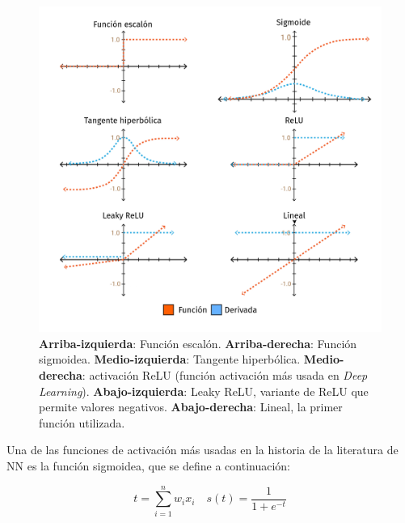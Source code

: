 \documentclass[a4paper,12pt]{article}
\begin{document}
\begin{figure}[H]
	\begin{center}				
		\includegraphics[width=1\textwidth]{021.png}
		\caption{\textbf{Arriba-izquierda}: Función escalón. \textbf{Arriba-derecha}: Función sigmoidea. \textbf{Medio-izquierda}: Tangente hiperbólica. \textbf{Medio-derecha}: activación ReLU (función activación más usada en \textit{Deep Learning}).
			\textbf{Abajo-izquierda}: Leaky ReLU, variante de ReLU que permite valores negativos. \textbf{Abajo-derecha}:
			Lineal, la primer función utilizada.\citep{AyyuceKizrak2020Jan}}
		\label{fig:typesfactivation}
	\end{center}
\end{figure}

\clearpage

Una de las funciones de activación más usadas en la historia de la literatura de NN es la función sigmoidea, que se define a continuación:

\begin{equation}
	t=\sum_{i=1}^{n}w_ix_i \quad s(t)=\frac{1}{1+e^{-t}}
\end{equation}
\end{document}

